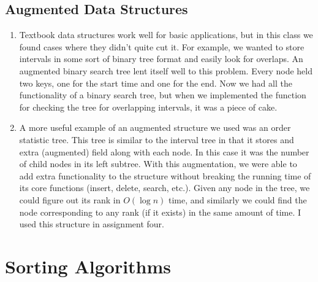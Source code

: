 \documentclass[a4paper,12pt]{article}
\begin{document}
\subsection*{Augmented Data Structures}

\begin{enumerate}[]

\item Textbook data structures work well for basic applications, but
  in this class we found cases where they didn't quite cut it. For
  example, we wanted to store intervals in some sort of binary tree
  format and easily look for overlaps. An augmented binary search tree
  lent itself well to this problem. Every node held two keys, one for
  the start time and one for the end. Now we had all the functionality
  of a binary search tree, but when we implemented the function for
  checking the tree for overlapping intervals, it was a piece of cake.

\item A more useful example of an augmented structure we used was an
  order statistic tree. This tree is similar to the interval tree in
  that it stores and extra (augmented) field along with each node. In
  this case it was the number of child nodes in its left subtree. With
  this augmentation, we were able to add extra functionality to the
  structure without breaking the running time of its core functions
  (insert, delete, search, etc.). Given any node in the tree, we could
  figure out its rank in $O(\log n)$ time, and similarly we could find
  the node corresponding to any rank (if it exists) in the same amount
  of time. I used this structure in assignment four.

\end{enumerate}

\section*{Sorting Algorithms}
\end{document}
